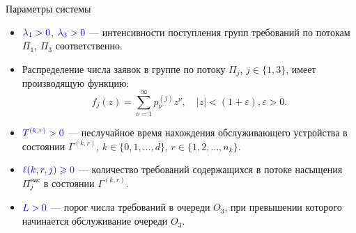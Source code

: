 \documentclass[10pt]{beamer}
\begin{document}



\begin{frame}{Параметры системы}
\begin{itemize}
    \item 
$\color{blue}\lambda_1>0$, $\color{blue}\lambda_3>0$ --- интенсивности поступления групп требований по потокам  $\Pi_1$, $\Pi_3$ соответственно.
  \item 
{\color{blue}Распределение числа заявок в группе} по потоку $\Pi_j$, $j \in \{1,3\}$, имеет производящую функцию:
$$
f_j(z) = \sum_{\nu=1}^{\infty} p_{\nu}^{(j)} z ^{\nu}, \quad |z|<(1+\varepsilon), \varepsilon>0.
$$
  \item 
$\color{blue}T^{(k,r)}>0$ --- неслучайное время нахождения обслуживающего устройства в состоянии $\Gamma^{(k,r)}$, $k\in \{0, 1, \ldots, d\}$, $r \in \{1, 2, \ldots, n_k\}$.  
  \item 
$\color{blue}\ell(k,r,j)\geqslant 0$ --- количество требований содержащихся в потоке насыщения $\Pi^{\text{нас}}_j$ в состоянии  $\Gamma^{(k,r)}$.
  \item 
$\color{blue}L > 0$ --- порог числа требований в очереди $O_3$, при превышении которого начинается обслуживание очереди $O_3$.
\end{itemize}

\end{frame}
\end{document}
